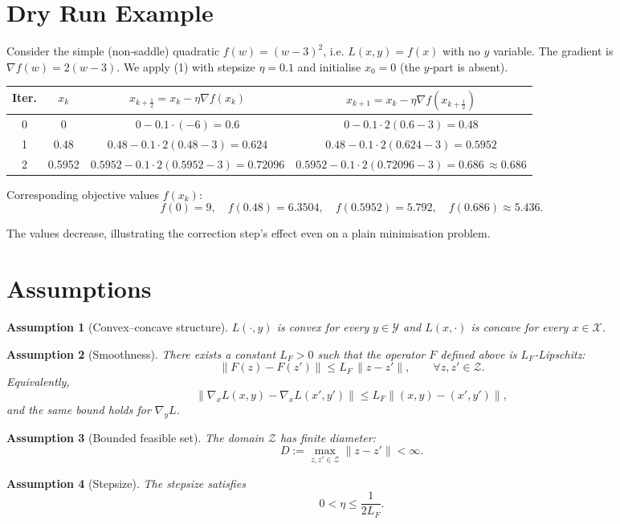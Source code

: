 \documentclass{article}
\newtheorem{assumption}{Assumption}
\begin{document}
\section*{Dry Run Example}
Consider the simple (non‑saddle) quadratic $f(w)=(w-3)^{2}$, i.e. $L(x,y)=f(x)$ with no $y$ variable.  
The gradient is $\nabla f(w)=2(w-3)$.  
We apply (1) with stepsize $\eta=0.1$ and initialise $x_{0}=0$ (the $y$‑part is absent).

\begin{center}
\begin{tabular}{c|c|c|c}
\textbf{Iter.}&$x_{k}$&$x_{k+\frac12}=x_{k}-\eta\nabla f(x_{k})$&$x_{k+1}=x_{k}-\eta\nabla f(x_{k+\frac12})$\\ \hline
0&0&$0-0.1\cdot(-6)=0.6$&$0-0.1\cdot 2(0.6-3)=0.48$\\[2mm]
1&0.48&$0.48-0.1\cdot2(0.48-3)=0.624$&$0.48-0.1\cdot2(0.624-3)=0.5952$\\[2mm]
2&0.5952&$0.5952-0.1\cdot2(0.5952-3)=0.72096$&$0.5952-0.1\cdot2(0.72096-3)=0.686\,\! \approx0.686$\\
\end{tabular}
\end{center}

Corresponding objective values $f(x_{k})$:
\[
f(0)=9,\quad f(0.48)=6.3504,\quad f(0.5952)=5.792,\quad f(0.686)\approx5.436.
\]

The values decrease, illustrating the correction step’s effect even on a plain minimisation problem.

\newpage
\section*{Assumptions}
\begin{assumption}[Convex–concave structure]\label{as:convexconcave}
$L(\cdot ,y)$ is convex for every $y\in\mathcal{Y}$ and $L(x,\cdot )$ is concave for every $x\in\mathcal{X}$.
\end{assumption}
\begin{assumption}[Smoothness]\label{as:smooth}
There exists a constant $L_{F}>0$ such that the operator $F$ defined above is $L_{F}$‑Lipschitz:
\[
\|F(z)-F(z')\| \le L_{F}\,\|z-z'\|,\qquad\forall z,z'\in\mathcal{Z}.
\]
Equivalently,
\[
\|\nabla_{x}L(x,y)-\nabla_{x}L(x',y')\|\le L_{F}\|(x,y)-(x',y')\|,
\]
and the same bound holds for $\nabla_{y}L$.
\end{assumption}
\begin{assumption}[Bounded feasible set]\label{as:bounded}
The domain $\mathcal{Z}$ has finite diameter:
\[
D:=\max_{z,z'\in\mathcal{Z}}\|z-z'\|<\infty .
\]
\end{assumption}
\begin{assumption}[Stepsize]\label{as:stepsize}
The stepsize satisfies
\[
0<\eta\le\frac{1}{2L_{F}} .
\]
\end{assumption}
\end{document}
